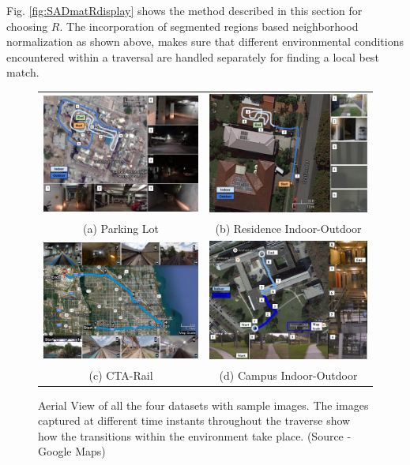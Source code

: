 \documentclass[letterpaper, 10 pt, conference]{ieeeconf}  %
\begin{document}
Fig. \ref{fig:SADmatRdisplay} shows the method described in this section for choosing $R$. The incorporation of segmented regions based neighborhood normalization as shown above, makes sure that different environmental conditions encountered within a traversal are handled separately for finding a local best match.

\begin{figure}[htbp]
\centering
\begin{tabular*}{\textwidth}{cc}
 \includegraphics[width=7cm,height=4cm]{Parking_Amrapali-Map-Images} &
 \hspace{2cm}
 \includegraphics[width=7cm,height=4cm]{Residence-IO-Map-Images} \\
 (a) Parking Lot & (b) Residence Indoor-Outdoor \\
 \includegraphics[width=7cm,height=4cm]{cta-datasetTrajSampleImages} &
 \hspace{2cm}
 \includegraphics[width=7cm,height=4cm]{campus-datasetTrajSampleImages} \\
 (c) CTA-Rail & (d) Campus Indoor-Outdoor \\
\end{tabular*}
 \caption{Aerial View of all the four datasets with sample images. The images captured at different time instants throughout the traverse show how the transitions within the environment take place. (Source - Google Maps)}
 \label{fig:datasetAerialTraj}
\end{figure}
\end{document}
